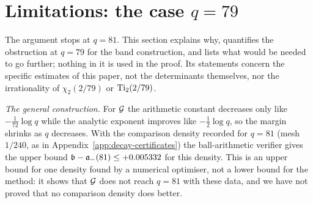 \section{Limitations: the case \texorpdfstring{$q=79$}{q = 79}}\label{sec:limitations}

The argument stops at $q=81$. This section explains why, quantifies the obstruction at $q=79$ for
the band construction, and lists what would be needed to go further; nothing in it is used in the
proof. Its statements concern the specific estimates of this paper, not the determinants
themselves, nor the irrationality of $\chi_2(2/79)$ or $\operatorname{Ti}_2(2/79)$.

\emph{The general construction.} For $\mathcal{G}$ the arithmetic constant decreases only like
$-\frac1{72}\log q$ while the analytic exponent improves like $-\frac12\log q$, so the margin
shrinks as $q$ decreases. With the comparison density recorded for $q=81$ (mesh $1/240$, as in
Appendix~\ref{app:decay-certificates}) the ball-arithmetic verifier gives the upper bound
$\mathfrak{b}-\mathfrak{a}_-(81)\le+0.005332$ for this density. This is an upper bound for one density found
by a numerical optimiser, not a lower bound for the method: it shows that $\mathcal{G}$ does not reach
$q=81$ with these data, and we have not proved that no comparison density does better.


